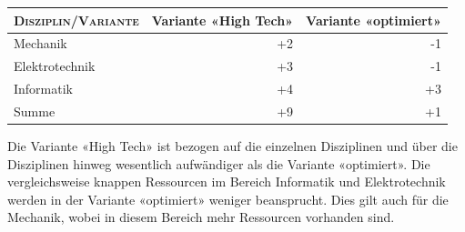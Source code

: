 \documentclass[a4paper,11pt]{scrartcl}
\begin{document}
\begin{tabularx}{\textwidth}{|l|r|r|}
    \hline
    \textsc{Disziplin/Variante} & Variante «High Tech» & Variante «optimiert» \\
    \hline
    Mechanik & +2 & -1 \\
    Elektrotechnik & +3 & -1 \\
    Informatik & +4 & +3 \\
    \hline
    Summe & +9 & +1 \\
    \hline
\end{tabularx}

Die Variante «High Tech» ist bezogen auf die einzelnen Disziplinen und über die Disziplinen hinweg wesentlich aufwändiger als die Variante «optimiert». Die vergleichsweise knappen Ressourcen im Bereich Informatik und Elektrotechnik werden in der Variante «optimiert» weniger beansprucht. Dies gilt auch für die Mechanik, wobei in diesem Bereich mehr Ressourcen vorhanden sind.

\newpage

\pagestyle{empty}
\end{document}

